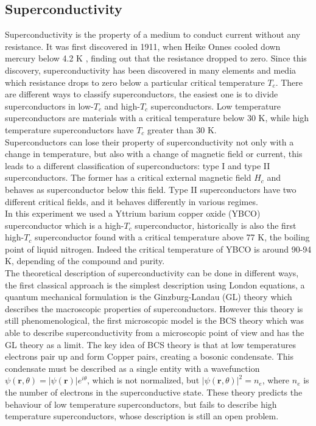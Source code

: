 \documentclass[a4paper,10pt]{article}
\begin{document}
\subsection{Superconductivity}
Superconductivity is the property of a medium to conduct current without any resistance. It was first discovered in 1911, when Heike Onnes cooled down mercury below 4.2 K \cite{firstsuperconductor}, finding out that the resistance dropped to zero. Since this discovery, superconductivity has been discovered in many elements and media which resistance drops to zero below a particular critical temperature $T_c$. There are different ways to classify superconductors, the easiest one is to divide superconductors in low-$T_c$ and high-$T_c$ superconductors. Low temperature superconductors are materials with a critical temperature below $30$ K, while high temperature superconductors have $T_c$ greater than 30 K.\\
Superconductors can lose their property of superconductivity not only with a change in temperature, but also with a change of magnetic field or current, this leads to a different classification of superconductors: type I and type II superconductors. The former has a critical external magnetic field $H_c$ and behaves as superconductor below this field. Type II superconductors have two different critical fields, and it behaves differently in various regimes.\\
In this experiment we used a Yttrium barium copper oxide (YBCO) superconductor which is a high-$T_c$ superconductor, historically is also the first high-$T_c$ superconductor found with a critical temperature above 77 K, the boiling point of liquid nitrogen. Indeed the critical temperature of YBCO is around 90-94 K, depending of the compound and purity.\\
The theoretical description of superconductivity can be done in different ways, the first classical approach is the simplest description using London equations, a quantum mechanical formulation is the Ginzburg-Landau (GL) theory which describes the macroscopic properties of superconductors. However this theory is still phenomenological, the first microscopic model is the BCS theory which was able to describe superconductivity from a microscopic point of view and has the GL theory as a limit. The key idea of BCS theory is that at low temperatures electrons pair up and form Copper pairs, creating a bosonic condensate. This condensate must be described as a single entity with a wavefunction $\psi(\mathbf{r},\theta) = |\psi(\mathbf{r})| e^{i\theta}$, which is not normalized, but $|\psi(\mathbf{r},\theta)|^2 = n_e$, where $n_e$ is the number of electrons in the superconductive state. These theory predicts the behaviour of low temperature superconductors, but fails to describe high temperature superconductors, whose description is still an open problem.\\
\end{document}
